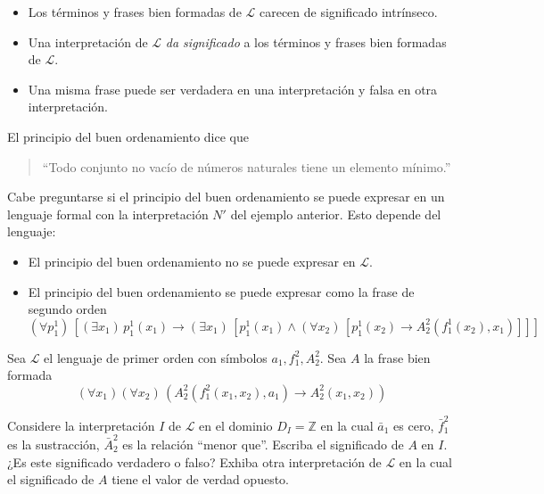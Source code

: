 \begin{remarks}
\leavevmode
\begin{itemize}
    \item Los términos y frases bien formadas de $\mathscr L$ carecen de significado intrínseco.
    \item Una interpretación de $\mathscr L$ \textit{da significado} a los términos y frases bien formadas de $\mathscr L$.
    \item Una misma frase puede ser verdadera en una interpretación y falsa en otra interpretación.
\end{itemize}
\end{remarks}

\begin{example}
El principio del buen ordenamiento dice que
\begin{quote}
``Todo conjunto no vacío de números naturales tiene un elemento mínimo.''
\end{quote}

Cabe preguntarse si el principio del buen ordenamiento se puede expresar en un lenguaje formal con la interpretación $N'$ del ejemplo anterior. Esto depende del lenguaje:

\begin{itemize}
    \item El principio del buen ordenamiento no se puede expresar en $\mathscr L$.
    
    \item El principio del buen ordenamiento se puede expresar como la frase de segundo orden
    $$(\forall p_1^1) \, [(\exists x_1) \, p_1^1(x_1) \to (\exists x_1) \, [p_1^1(x_1) \wedge (\forall x_2) \, [p_1^1(x_2) \to    A_2^2(f_1^1(x_2), x_1)]]]$$
\end{itemize}
\end{example}

\setcounter{exercise}{10}
\begin{exercise}
Sea $\mathscr L$ el lenguaje de primer orden con símbolos $a_1, f_1^2, A_2^2$. Sea $A$ la frase bien formada
$$(\forall x_1) (\forall x_2) \, (A_2^2(f_1^2(x_1, x_2), a_1) \to A_2^2(x_1, x_2))$$

Considere la interpretación $I$ de $\mathscr L$ en el dominio $D_I = \mathbb Z$ en la cual $\bar a_1$ es cero, $\bar f_1^2$ es la sustracción, $\bar A_2^2$ es la relación ``menor que''. Escriba el significado de $A$ en $I$. ¿Es este significado verdadero o falso? Exhiba otra interpretación de $\mathscr L$ en la cual el significado de $A$ tiene el valor de verdad opuesto.
\end{exercise}

